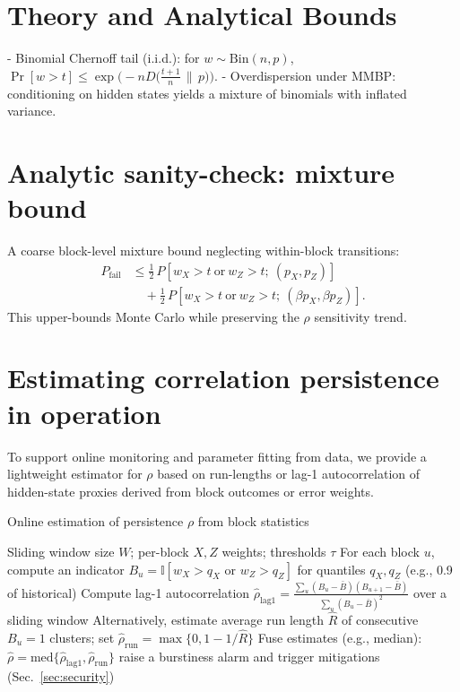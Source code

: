 \documentclass{article}
\begin{document}
\section{Theory and Analytical Bounds}
- Binomial Chernoff tail (i.i.d.): for \(w\sim\mathrm{Bin}(n,p)\), \( \Pr[w>t] \le \exp\!\big(-n D\big(\tfrac{t+1}{n}\,\|\, p\big)\big)\).
- Overdispersion under MMBP: conditioning on hidden states yields a mixture of binomials with inflated variance.

\section{Analytic sanity-check: mixture bound}\label{sec:analysis-mixture}
A coarse block-level mixture bound neglecting within-block transitions:
\begin{align}
P_{\mathrm{fail}}
&\le \tfrac{1}{2}\,P\!\left[w_X>t \ \text{or}\ w_Z>t;\ (p_X,p_Z)\right] \nonumber\\
&\quad + \tfrac{1}{2}\,P\!\left[w_X>t \ \text{or}\ w_Z>t;\ (\beta p_X,\beta p_Z)\right].
\end{align}
This upper-bounds Monte Carlo while preserving the \(\rho\) sensitivity trend.

\section{Estimating correlation persistence in operation}
To support online monitoring and parameter fitting from data, we provide a lightweight estimator for \(\rho\) based on run-lengths or lag-1 autocorrelation of hidden-state proxies derived from block outcomes or error weights.

\begin{algorithm}[ht]
\small
\caption{Online estimation of persistence \(\rho\) from block statistics}\label{alg:rhostat}
\begin{algorithmic}[1]
\Require Sliding window size \(W\); per-block \(X,Z\) weights; thresholds \(\tau\)
\State For each block \(u\), compute an indicator \(B_u=\mathbb{I}[w_X>q_X \text{ or } w_Z>q_Z]\) for quantiles \(q_X,q_Z\) (e.g., 0.9 of historical)
\State Compute lag-1 autocorrelation \(\widehat{\rho}_{\mathrm{lag1}}=\frac{\sum_{u}(B_u-\bar{B})(B_{u+1}-\bar{B})}{\sum_{u}(B_u-\bar{B})^2}\) over a sliding window
\State Alternatively, estimate average run length \(\widehat{R}\) of consecutive \(B_u=1\) clusters; set \(\widehat{\rho}_{\mathrm{run}}=\max\{0,1-1/\widehat{R}\}\)
\State Fuse estimates (e.g., median): \(\widehat{\rho}=\mathrm{med}\{\widehat{\rho}_{\mathrm{lag1}},\widehat{\rho}_{\mathrm{run}}\}\)
\If{\(\widehat{\rho}>\tau\)} raise a burstiness alarm and trigger mitigations (Sec.~\ref{sec:security}) \EndIf
\end{algorithmic}
\end{algorithm}
\end{document}
